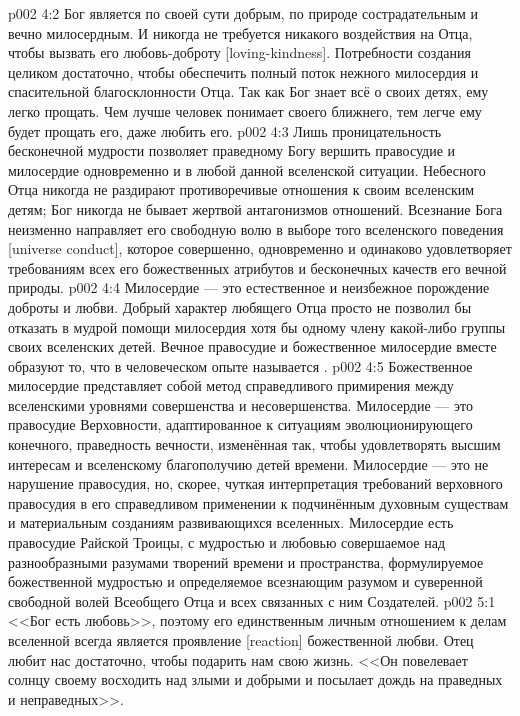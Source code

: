 \vs p002 4:2 Бог является по своей сути добрым, по природе сострадательным и вечно милосердным. И никогда не требуется никакого воздействия на Отца, чтобы вызвать его любовь\hyp{}доброту [loving\hyp{}kindness]. Потребности создания целиком достаточно, чтобы обеспечить полный поток нежного милосердия и спасительной благосклонности Отца. Так как Бог знает всё о своих детях, ему легко прощать. Чем лучше человек понимает своего ближнего, тем легче ему будет прощать его, даже любить его.
\vs p002 4:3 \pc Лишь проницательность бесконечной мудрости позволяет праведному Богу вершить правосудие и милосердие одновременно и в любой данной вселенской ситуации. Небесного Отца никогда не раздирают противоречивые отношения к своим вселенским детям; Бог никогда не бывает жертвой антагонизмов отношений. Всезнание Бога неизменно направляет его свободную волю в выборе того вселенского поведения [universe conduct], которое совершенно, одновременно и одинаково удовлетворяет требованиям всех его божественных атрибутов и бесконечных качеств его вечной природы.
\vs p002 4:4 Милосердие --- это естественное и неизбежное порождение доброты и любви. Добрый характер любящего Отца просто не позволил бы отказать в мудрой помощи милосердия хотя бы одному члену какой\hyp{}либо группы своих вселенских детей. Вечное правосудие и божественное милосердие вместе образуют то, что в человеческом опыте называется .
\vs p002 4:5 Божественное милосердие представляет собой метод справедливого примирения между вселенскими уровнями совершенства и несовершенства. Милосердие --- это правосудие Верховности, адаптированное к ситуациям эволюционирующего конечного, праведность вечности, изменённая так, чтобы удовлетворять высшим интересам и вселенскому благополучию детей времени. Милосердие --- это не нарушение правосудия, но, скорее, чуткая интерпретация требований верховного правосудия в его справедливом применении к подчинённым духовным существам и материальным созданиям развивающихся вселенных. Милосердие есть правосудие Райской Троицы, с мудростью и любовью совершаемое над разнообразными разумами творений времени и пространства, формулируемое божественной мудростью и определяемое всезнающим разумом и суверенной свободной волей Всеобщего Отца и всех связанных с ним Создателей.
\vs p002 5:1 <<Бог есть любовь>>, поэтому его единственным личным отношением к делам вселенной всегда является проявление [reaction] божественной любви. Отец любит нас достаточно, чтобы подарить нам свою жизнь. <<Он повелевает солнцу своему восходить над злыми и добрыми и посылает дождь на праведных и неправедных>>.
